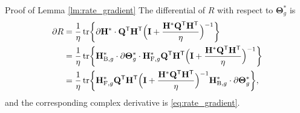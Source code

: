 \begin{appendix}
\begin{subsection}{Proof of Lemma \ref{lm:rate_gradient}}\label{ap:rate_gradient}
	The differential of $R$ with respect to $\mathbf{\Theta}_g^*$ is \cite{Hjorungnes2007}
	\begin{align*}
		\partial R
		 & = \frac{1}{\eta} \operatorname{tr} \biggl\{ \partial \mathbf{H}^* \cdot \mathbf{Q}^\mathsf{T} \mathbf{H}^\mathsf{T} \Bigl(\mathbf{I} + \frac{\mathbf{H}^* \mathbf{Q}^\mathsf{T} \mathbf{H}^\mathsf{T}}{\eta}\Bigr)^{-1} \biggr\}                                                                      \\
		 & = \frac{1}{\eta} \operatorname{tr} \biggl\{ \mathbf{H}_{\mathrm{B},g}^* \cdot \partial \mathbf{\Theta}_g^* \cdot \mathbf{H}_{\mathrm{F},g}^* \mathbf{Q}^\mathsf{T} \mathbf{H}^\mathsf{T} \Bigl(\mathbf{I} + \frac{\mathbf{H}^* \mathbf{Q}^\mathsf{T} \mathbf{H}^\mathsf{T}}{\eta}\Bigr)^{-1} \biggr\} \\
		 & = \frac{1}{\eta} \operatorname{tr} \biggl\{ \mathbf{H}_{\mathrm{F},g}^* \mathbf{Q}^\mathsf{T} \mathbf{H}^\mathsf{T} \Bigl(\mathbf{I} + \frac{\mathbf{H}^* \mathbf{Q}^\mathsf{T} \mathbf{H}^\mathsf{T}}{\eta}\Bigr)^{-1} \mathbf{H}_{\mathrm{B},g}^* \cdot \partial \mathbf{\Theta}_g^* \biggr\},
	\end{align*}
	and the corresponding complex derivative is \eqref{eq:rate_gradient}.
\end{subsection}

\end{appendix}


